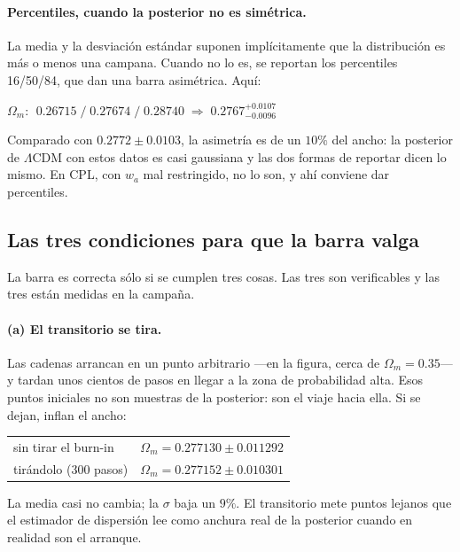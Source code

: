 \documentclass[11pt,a4paper]{article}
\begin{document}
\paragraph{Percentiles, cuando la posterior no es simétrica.} La media y la
desviación estándar suponen implícitamente que la distribución es más o menos
una campana. Cuando no lo es, se reportan los percentiles 16/50/84, que dan
una barra asimétrica. Aquí:

\begin{center}
\small
$\Omega_m$: $\;0.26715 \;/\; 0.27674 \;/\; 0.28740
  \;\Longrightarrow\; 0.2767^{+0.0107}_{-0.0096}$
\end{center}

\noindent
Comparado con $0.2772 \pm 0.0103$, la asimetría es de un $10\%$ del ancho: la
posterior de $\Lambda$CDM con estos datos es casi gaussiana y las dos formas
de reportar dicen lo mismo. En CPL, con $w_a$ mal restringido, no lo son, y
ahí conviene dar percentiles.

\subsection{Las tres condiciones para que la barra valga}

La barra es correcta sólo si se cumplen tres cosas. Las tres son
verificables y las tres están medidas en la campaña.

\paragraph{(a) El transitorio se tira.} Las cadenas arrancan en un punto
arbitrario ---en la figura, cerca de $\Omega_m = 0.35$--- y tardan unos
cientos de pasos en llegar a la zona de probabilidad alta. Esos puntos
iniciales no son muestras de la posterior: son el viaje hacia ella. Si se
dejan, inflan el ancho:

\begin{center}
\small
\begin{tabular}{lr}
\toprule
sin tirar el burn-in & $\Omega_m = 0.277130 \pm 0.011292$ \\
tirándolo (300 pasos) & $\Omega_m = 0.277152 \pm 0.010301$ \\
\bottomrule
\end{tabular}
\end{center}

\noindent
La media casi no cambia; la $\sigma$ baja un $9\%$. El transitorio mete puntos
lejanos que el estimador de dispersión lee como anchura real de la posterior
cuando en realidad son el arranque.
\end{document}
